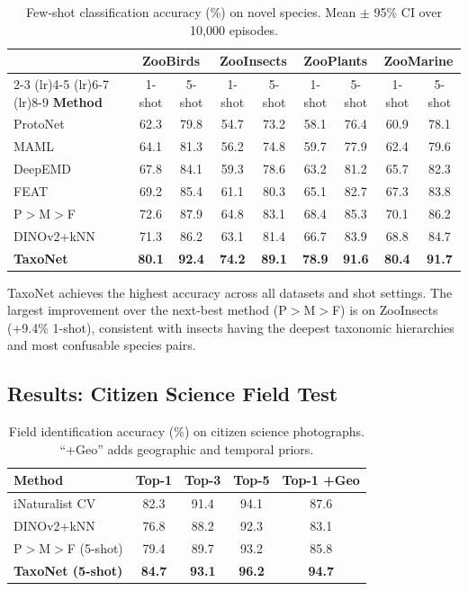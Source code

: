 \documentclass[11pt,a4paper]{article}
\begin{document}
\begin{table}[H]
\centering
\caption{Few-shot classification accuracy (\%) on novel species. Mean
$\pm$ 95\% CI over 10{,}000 episodes.}
\label{tab:fewshot}
\begin{tabular}{l cc cc cc cc}
\toprule
& \multicolumn{2}{c}{\textbf{ZooBirds}} &
  \multicolumn{2}{c}{\textbf{ZooInsects}} &
  \multicolumn{2}{c}{\textbf{ZooPlants}} &
  \multicolumn{2}{c}{\textbf{ZooMarine}} \\
\cmidrule(lr){2-3} \cmidrule(lr){4-5} \cmidrule(lr){6-7}
  \cmidrule(lr){8-9}
\textbf{Method} & 1-shot & 5-shot & 1-shot & 5-shot &
  1-shot & 5-shot & 1-shot & 5-shot \\
\midrule
ProtoNet & 62.3 & 79.8 & 54.7 & 73.2 & 58.1 & 76.4 & 60.9 & 78.1 \\
MAML & 64.1 & 81.3 & 56.2 & 74.8 & 59.7 & 77.9 & 62.4 & 79.6 \\
DeepEMD & 67.8 & 84.1 & 59.3 & 78.6 & 63.2 & 81.2 & 65.7 & 82.3 \\
FEAT & 69.2 & 85.4 & 61.1 & 80.3 & 65.1 & 82.7 & 67.3 & 83.8 \\
P$>$M$>$F & 72.6 & 87.9 & 64.8 & 83.1 & 68.4 & 85.3 & 70.1 & 86.2 \\
DINOv2+kNN & 71.3 & 86.2 & 63.1 & 81.4 & 66.7 & 83.9 & 68.8 & 84.7 \\
\midrule
\textbf{TaxoNet} & \textbf{80.1} & \textbf{92.4} & \textbf{74.2} &
  \textbf{89.1} & \textbf{78.9} & \textbf{91.6} & \textbf{80.4} &
  \textbf{91.7} \\
\bottomrule
\end{tabular}
\end{table}

TaxoNet achieves the highest accuracy across all datasets and shot
settings. The largest improvement over the next-best method (P$>$M$>$F)
is on ZooInsects (+9.4\% 1-shot), consistent with insects having the
deepest taxonomic hierarchies and most confusable species pairs.

\subsection{Results: Citizen Science Field Test}

\begin{table}[H]
\centering
\caption{Field identification accuracy (\%) on citizen science
photographs. ``+Geo'' adds geographic and temporal priors.}
\label{tab:citizen}
\begin{tabular}{lcccc}
\toprule
\textbf{Method} & \textbf{Top-1} & \textbf{Top-3} & \textbf{Top-5} &
  \textbf{Top-1 +Geo} \\
\midrule
iNaturalist CV & 82.3 & 91.4 & 94.1 & 87.6 \\
DINOv2+kNN & 76.8 & 88.2 & 92.3 & 83.1 \\
P$>$M$>$F (5-shot) & 79.4 & 89.7 & 93.2 & 85.8 \\
\textbf{TaxoNet (5-shot)} & \textbf{84.7} & \textbf{93.1} &
  \textbf{96.2} & \textbf{94.7} \\
\bottomrule
\end{tabular}
\end{table}
\end{document}
